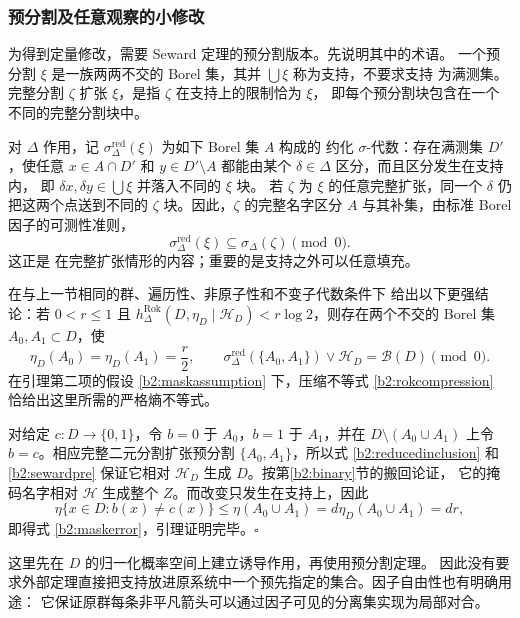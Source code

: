\documentclass[UTF8,zihao=-4,a4paper]{ctexart}
\numberwithin{equation}{section}
\begin{document}
\subsubsection{预分割及任意观察的小修改}\label{b2:prepartition}

为得到定量修改，需要 Seward 定理的预分割版本。先说明其中的术语。
一个预分割 $\xi$ 是一族两两不交的 Borel 集，其并 $\bigcup\xi$ 称为支持，不要求支持
为满测集。完整分割 $\zeta$ 扩张 $\xi$，是指 $\zeta$ 在支持上的限制恰为 $\xi$，
即每个预分割块包含在一个不同的完整分割块中。

对 $\Delta$ 作用，记 $\sigma^{\mathrm{red}}_\Delta(\xi)$ 为如下 Borel 集 $A$ 构成的
约化 $\sigma$-代数：存在满测集 $D'$，使任意 $x\in A\cap D'$ 和
$y\in D'\setminus A$ 都能由某个 $\delta\in\Delta$ 区分，而且区分发生在支持内，
即 $\delta x,\delta y\in\bigcup\xi$ 并落入不同的 $\xi$ 块。
若 $\zeta$ 为 $\xi$ 的任意完整扩张，同一个 $\delta$ 仍把这两个点送到不同的
$\zeta$ 块。因此，$\zeta$ 的完整名字区分 $A$ 与其补集，由标准 Borel 因子的可测性准则，
\begin{equation}\label{b2:reducedinclusion}
 \sigma^{\mathrm{red}}_\Delta(\xi)\subseteq\sigma_\Delta(\zeta)\pmod0.
\end{equation}
这正是 \cite[Lemma~2.2]{Seward} 在完整扩张情形的内容；重要的是支持之外可以任意填充。

\cite[Theorem~2.3]{Seward} 在与上一节相同的群、遍历性、非原子性和不变子代数条件下
给出以下更强结论：若 $0<r\le1$ 且
$h^{\mathrm{Rok}}_\Delta(D,\eta_D\mid\mathcal H_D)<r\log2$，则存在两个不交的
Borel 集 $A_0,A_1\subset D$，使
\begin{equation}\label{b2:sewardpre}
 \eta_D(A_0)=\eta_D(A_1)=\frac r2,\qquad
 \sigma^{\mathrm{red}}_\Delta(\{A_0,A_1\})\vee\mathcal H_D
 =\mathcal B(D)\pmod0.
\end{equation}
在引理第二项的假设 \eqref{b2:maskassumption} 下，压缩不等式
\eqref{b2:rokcompression} 恰给出这里所需的严格熵不等式。

对给定 $c:D\to\{0,1\}$，令 $b=0$ 于 $A_0$，$b=1$ 于 $A_1$，并在
$D\setminus(A_0\cup A_1)$ 上令 $b=c$。相应完整二元分割扩张预分割
$\{A_0,A_1\}$，所以式 \eqref{b2:reducedinclusion} 和 \eqref{b2:sewardpre}
保证它相对 $\mathcal H_D$ 生成 $D$。按第\ref{b2:binary}节的搬回论证，
它的掩码名字相对 $\mathcal H$ 生成整个 $Z$。而改变只发生在支持上，因此
\[
 \eta\{x\in D:b(x)\ne c(x)\}
 \le\eta(A_0\cup A_1)=d\eta_D(A_0\cup A_1)=dr,
\]
即得式 \eqref{b2:maskerror}，引理证明完毕。\hfill$\square$

这里先在 $D$ 的归一化概率空间上建立诱导作用，再使用预分割定理。
因此没有要求外部定理直接把支持放进原系统中一个预先指定的集合。因子自由性也有明确用途：
它保证原群每条非平凡箭头可以通过因子可见的分离集实现为局部对合。
\end{document}
